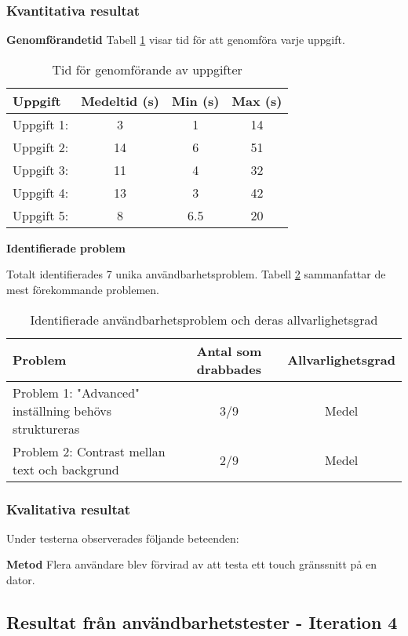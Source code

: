 \subsubsection{Kvantitativa resultat}

\textbf{Genomförandetid}
Tabell \ref{tab:tid} visar tid för att genomföra varje uppgift.
\begin{table}[H]
\centering
\begin{tabular}{|l|c|c|c|}
\hline
\textbf{Uppgift} & \textbf{Medeltid (s)} & \textbf{Min (s)} & \textbf{Max (s)} \\
\hline
Uppgift 1:  & 3 & 1 & 14 \\
Uppgift 2:  & 14 & 6 & 51\\
Uppgift 3:  & 11 & 4 & 32\\
Uppgift 4:  & 13 & 3 & 42\\
Uppgift 5:  & 8 & 6.5 & 20\\
\hline
\end{tabular}
\caption{Tid för genomförande av uppgifter}
\label{tab:tid}
\end{table}


\textbf{Identifierade problem}

Totalt identifierades 7 unika användbarhetsproblem. Tabell \ref{tab:problem2} sammanfattar de mest förekommande problemen.
\begin{table}[H]
\centering
\begin{tabular}{|p{6cm}|c|c|}
\hline
\textbf{Problem} & \textbf{Antal som drabbades} & \textbf{Allvarlighetsgrad} \\
\hline
Problem 1: "Advanced" inställning behövs struktureras & 3/9 & Medel\\
Problem 2: Contrast mellan text och backgrund & 2/9 &  Medel \\
\hline
\end{tabular}
\caption{Identifierade användbarhetsproblem och deras allvarlighetsgrad}
\label{tab:problem2}
\end{table}


\subsubsection{Kvalitativa resultat}

Under testerna observerades följande beteenden:

\textbf{Metod} Flera användare blev förvirad av att testa ett touch gränssnitt på en dator. 

\subsection{Resultat från användbarhetstester - Iteration 4}

